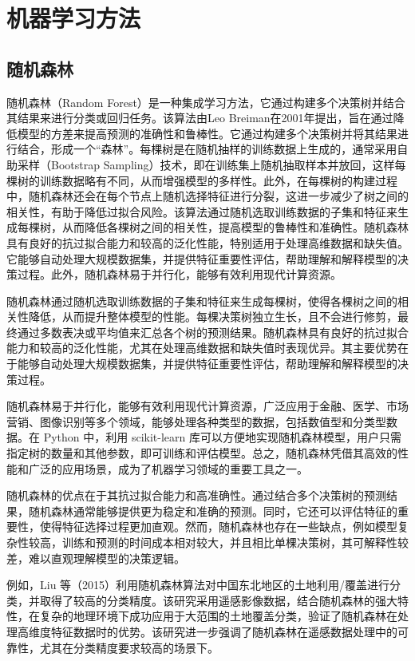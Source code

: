\documentclass[AutoFakeBold]{LZUThesis-PgD&PhD}
\begin{document}
\section{机器学习方法}

\subsection{随机森林}
随机森林（Random Forest）是一种集成学习方法，它通过构建多个决策树并结合其结果来进行分类或回归任务。该算法由Leo Breiman在2001年提出，旨在通过降低模型的方差来提高预测的准确性和鲁棒性。它通过构建多个决策树并将其结果进行结合，形成一个“森林”。每棵树是在随机抽样的训练数据上生成的，通常采用自助采样（Bootstrap Sampling）技术，即在训练集上随机抽取样本并放回，这样每棵树的训练数据略有不同，从而增强模型的多样性。此外，在每棵树的构建过程中，随机森林还会在每个节点上随机选择特征进行分裂，这进一步减少了树之间的相关性，有助于降低过拟合风险。该算法通过随机选取训练数据的子集和特征来生成每棵树，从而降低各棵树之间的相关性，提高模型的鲁棒性和准确性。随机森林具有良好的抗过拟合能力和较高的泛化性能，特别适用于处理高维数据和缺失值。它能够自动处理大规模数据集，并提供特征重要性评估，帮助理解和解释模型的决策过程。此外，随机森林易于并行化，能够有效利用现代计算资源。

随机森林通过随机选取训练数据的子集和特征来生成每棵树，使得各棵树之间的相关性降低，从而提升整体模型的性能。每棵决策树独立生长，且不会进行修剪，最终通过多数表决或平均值来汇总各个树的预测结果。随机森林具有良好的抗过拟合能力和较高的泛化性能，尤其在处理高维数据和缺失值时表现优异。其主要优势在于能够自动处理大规模数据集，并提供特征重要性评估，帮助理解和解释模型的决策过程。

随机森林易于并行化，能够有效利用现代计算资源，广泛应用于金融、医学、市场营销、图像识别等多个领域，能够处理各种类型的数据，包括数值型和分类型数据。在 Python 中，利用 scikit-learn 库可以方便地实现随机森林模型，用户只需指定树的数量和其他参数，即可训练和评估模型。总之，随机森林凭借其高效的性能和广泛的应用场景，成为了机器学习领域的重要工具之一。

随机森林的优点在于其抗过拟合能力和高准确性。通过结合多个决策树的预测结果，随机森林通常能够提供更为稳定和准确的预测。同时，它还可以评估特征的重要性，使得特征选择过程更加直观。然而，随机森林也存在一些缺点，例如模型复杂性较高，训练和预测的时间成本相对较大，并且相比单棵决策树，其可解释性较差，难以直观理解模型的决策逻辑。

例如，Liu 等（2015）利用随机森林算法对中国东北地区的土地利用/覆盖进行分类，并取得了较高的分类精度。该研究采用遥感影像数据，结合随机森林的强大特性，在复杂的地理环境下成功应用于大范围的土地覆盖分类，验证了随机森林在处理高维度特征数据时的优势\cite{liu2015}。该研究进一步强调了随机森林在遥感数据处理中的可靠性，尤其在分类精度要求较高的场景下。
\end{document}
